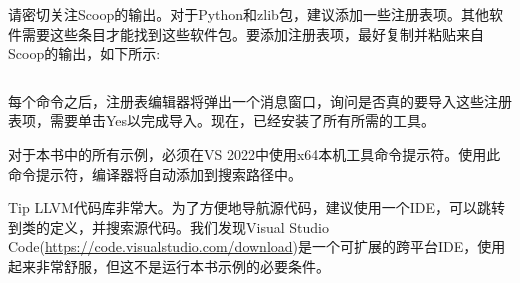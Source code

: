 
请密切关注Scoop的输出。对于Python和zlib包，建议添加一些注册表项。其他软件需要这些条目才能找到这些软件包。要添加注册表项，最好复制并粘贴来自Scoop的输出，如下所示:

\begin{shell}
$ %
$ %
\end{shell}

每个命令之后，注册表编辑器将弹出一个消息窗口，询问是否真的要导入这些注册表项，需要单击Yes以完成导入。现在，已经安装了所有所需的工具。

对于本书中的所有示例，必须在VS 2022中使用x64本机工具命令提示符。使用此命令提示符，编译器将自动添加到搜索路径中。

\begin{myTip}{Tip}
LLVM代码库非常大。为了方便地导航源代码，建议使用一个IDE，可以跳转到类的定义，并搜索源代码。我们发现Visual Studio Code(\url{https://code.visualstudio.com/download})是一个可扩展的跨平台IDE，使用起来非常舒服，但这不是运行本书示例的必要条件。
\end{myTip}

